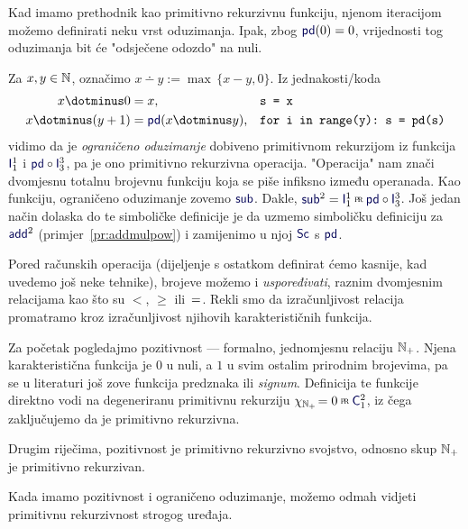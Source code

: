 Kad imamo prethodnik kao primitivno rekurzivnu funkciju, njenom iteracijom mo\-že\-mo definirati neku vrst oduzimanja. Ipak, zbog $\f{pd}(0)=0$, vrijednosti tog oduzimanja bit će "odsječene odozdo" na nuli.

\begin{primjer}[{name=[primitivna rekurzivnost ograničenog oduzimanja]}]\label{pr:sub}
Za $x,y\in{\mathbb N}$, označimo $x\dotminus y:=\max\,\{x-y,0\}$. Iz jednakosti\slash koda
\begin{align}
	x\dotminus0&=x\text,&&\texttt{s = x}\\
	x\dotminus(y+1)&=\f{pd}(x\dotminus y)\text,&&\texttt{for i in range(y):~s = pd(s)}
\end{align}
vidimo da je \emph{ograničeno oduzimanje} dobiveno primitivnom rekurzijom iz funkcija $\f I_1^1$ i $\f{pd}\circ\f I_3^3$, pa je ono primitivno rekurzivna operacija. "Operacija" nam znači dvomjesnu totalnu brojevnu funkciju koja se piše infiksno između operanada. Kao funkciju, ograničeno oduzimanje zovemo $\f{sub}$. Dakle, $\f{sub}^2=\f I_1^1\pr\f{pd}\circ\f I_3^3$. Još jedan način dolaska do te simboličke definicije je da uzmemo simboličku definiciju za $\f{add}^2$ (primjer~\ref{pr:addmulpow}) i zamijenimo u njoj $\f{Sc}$ s $\f{pd}$.
\end{primjer}

Pored računskih operacija (dijeljenje s ostatkom definirat ćemo kasnije, kad uvedemo još neke tehnike), brojeve možemo i \emph{uspoređivati}, raznim dvomjesnim relacijama  kao što su $<$, $\ge$ ili~$=$. Rekli smo da izračunljivost relacija promatramo kroz izračunljivost njihovih karakterističnih funkcija.

\begin{primjer}[{name=[primitivna rekurzivnost pozitivnosti]}]\label{pr:N+prn}
Za početak pogledajmo pozitivnost --- formalno, jednomjesnu relaciju ${\mathbb N}_+$. Njena karakteristična funkcija je $0$ u nuli, a $1$ u svim ostalim prirodnim brojevima, pa se u literaturi još zove funkcija predznaka ili \emph{signum}. Definicija te funkcije direktno vodi na degeneriranu primitivnu rekurziju $\chi_{\N_+}\!=0\pr\f C_1^2$, iz čega zaključujemo da je primitivno rekurzivna.

	Drugim riječima, pozitivnost je primitivno rekurzivno svojstvo, odnosno skup ${\mathbb N}_+$ je primitivno rekurzivan.
\end{primjer}

Kada imamo pozitivnost i ograničeno oduzimanje, možemo odmah vidjeti primitivnu rekurzivnost strogog uređaja. %

